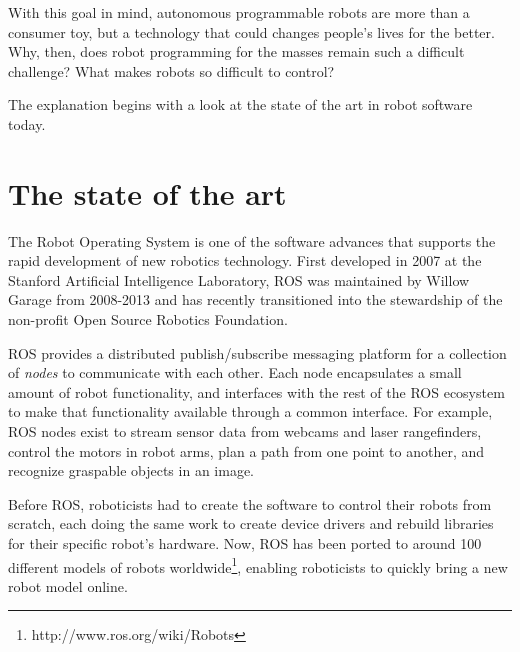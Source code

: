 \documentclass[10pt,twocolumn]{article}
\begin{document}
With this goal in mind, autonomous programmable robots are more than a consumer toy, but a technology that could changes people's lives for the better. Why, then, does robot programming for the masses remain such a difficult challenge? What makes robots so difficult to control?

The explanation begins with a look at the state of the art in robot software today.


\section{The state of the art}


The Robot Operating System\cite{ros} is one of the software advances that supports the rapid development of new robotics technology.  First developed in 2007 at the Stanford Artificial Intelligence Laboratory, ROS was maintained by Willow Garage from 2008-2013 and has recently transitioned into the stewardship of the non-profit Open Source Robotics Foundation.

ROS provides a distributed publish/subscribe messaging platform for a collection of {\em nodes} to communicate with each other. Each node encapsulates a small amount of robot functionality, and interfaces with the rest of the ROS ecosystem to make that functionality available through a common interface. For example, ROS nodes exist to stream sensor data from webcams and laser rangefinders, control the motors in robot arms, plan a path from one point to another, and recognize graspable objects in an image.

Before ROS, roboticists had to create the software to control their robots from scratch, each doing the same work to create device drivers and rebuild libraries for their specific robot's hardware.  Now, ROS has been ported to around 100 different models of robots worldwide\footnote{http://www.ros.org/wiki/Robots}, enabling roboticists to quickly bring a new robot model online.
\end{document}
